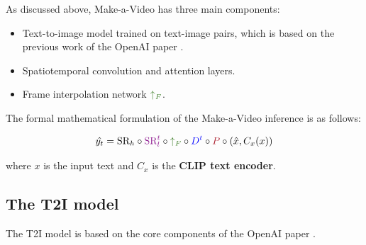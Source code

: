 As discussed above, Make-a-Video has three main components:

\begin{itemize}
    \item Text-to-image model trained on text-image pairs, which is based on the previous work of the OpenAI paper \cite{ramesh2022hierarchical}.
    \item Spatiotemporal convolution and attention layers.
    \item Frame interpolation network $\textcolor{OliveGreen}{\uparrow_F}$.
\end{itemize}

The formal mathematical formulation of the Make-a-Video inference is as follows:

\[ \hat{y_t} = \text{SR}_h \circ \textcolor{Plum}{\text{SR}_l^t} \circ \textcolor{OliveGreen}{\uparrow_F} \circ \textcolor{blue}{D^t} \circ \textcolor{Maroon}{P} \circ \left( \hat{x}, C_x (x) \right) \]

where $x$ is the input text and $C_x$ is the \textbf{CLIP text encoder}.





\subsection{The T2I model}

The T2I model is based on the core components of the OpenAI paper \cite{ramesh2022hierarchical}. %